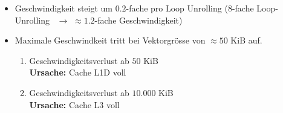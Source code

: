 \documentclass{article}
\begin{document}
\begin{itemize}
	\item Geschwindigkeit steigt um $0.2$-fache pro Loop Unrolling ($8$-fache Loop-Unrolling \
		$\rightarrow$ $\approx 1.2$-fache Geschwindigkeit)
	\item Maximale Geschwindkeit tritt bei Vektorgr\"osse von $\approx 50$ KiB auf.
		\begin{enumerate}
			\item Geschwindigkeitsverlust ab $50$ KiB\\ \textbf{Ursache:} Cache L1D voll
			\item Geschwindigkeitsverlust ab $10.000$ KiB\\ \textbf{Ursache:} Cache L3 voll
		\end{enumerate}
\end{itemize}
\end{document}
